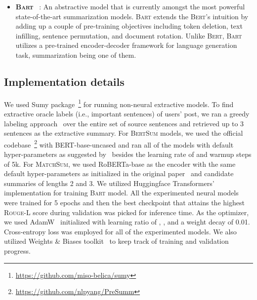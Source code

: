 \documentclass[10pt, a4paper]{article}
\newcommand{\bart}{\textsc{Bart}}
\newcommand{\rgl}{\textsc{Rouge-L}}
\begin{document}
\begin{itemize}[leftmargin=*,label={-}]
\item \textsc{\textbf{Bart}} ~\cite{Lewis2020BARTDS}: An abstractive model that is currently amongst the most powerful state-of-the-art summarization models. \bart{} extends the \textsc{Bert}'s intuition by adding up a couple of pre-training objectives including token deletion, text infilling, sentence permutation, and document rotation. Unlike \textsc{Bert}, \bart{} utilizes a pre-trained encoder-decoder framework for language generation task,  summarization being one of them.

\end{itemize}



\subsection{Implementation details}

We used Sumy package~\footnote{\url{https://github.com/miso-belica/sumy}} for running non-neural extractive models. To find extractive oracle labels (i.e., important sentences) of users' post, we ran a greedy labeling approach~\cite{Liu2019TextSW} over the entire set of source sentences and retrieved up to 3 sentences as the extractive summary. For \textsc{BertSum} models, we used the official codebase~\footnote{\url{https://github.com/nlpyang/PreSumm}} with {\selectfont BERT-base-uncased} and ran all of the models with default hyper-parameters as suggested by~ besides the learning rate of  and warmup steps of 5k. For \textsc{MatchSum}, we used  {\selectfont RoBERTa-base} as the encoder with the same default hyper-parameters as initialized in the original paper~\cite{Zhong2020ExtractiveSA} and candidate summaries of lengths 2 and 3.  We utilized Huggingface Transformers'~\cite{Wolf2020Transformers} implementation for training \bart{} model. All the experimented neural models were trained for 5 epochs and then the best checkpoint that attains the highest \rgl{} score during validation was picked for inference time. As the optimizer, we used AdamW~\cite{Loshchilov2019DecoupledWD} initialized with learning ratio of , , and a weight decay of 0.01. Cross-entropy loss was employed for all of the experimented models. We also utilized Weights \& Biases toolkit~\cite{wandb} to keep track of training and validation progress. 
 
\end{document}
